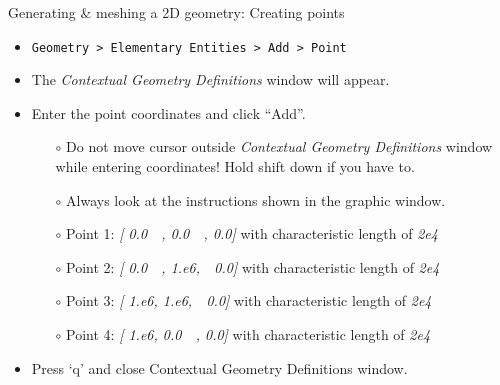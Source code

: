 \documentclass[t]{beamer}
\begin{document}
\begin{frame}{Generating \& meshing a 2D geometry: Creating points}
  \begin{itemize}
  \item \lstinline{Geometry > Elementary Entities > Add > Point}\\[4pt]
  \item The \emph{Contextual Geometry Definitions} window will appear.\\[4pt]
  \item Enter the point coordinates and click ``Add''.\\[4pt]
  \begin{itemize}
    \item[$\circ$] Do not move cursor outside \emph{Contextual Geometry Definitions} window while entering coordinates! Hold shift down if you have to.\\[4pt]
    \item[$\circ$] Always look at the instructions shown in the graphic window.\\[4pt]
    \item[$\circ$] Point 1: \emph{[ 0.0\ \ ,  0.0\ \ ,  0.0]} with characteristic length of \emph{2e4}\\[5pt]
    \item[$\circ$] Point 2: \emph{[ 0.0\ \ ,  1.e6,\ \ 0.0]} with characteristic length of \emph{2e4}\\[5pt]
    \item[$\circ$] Point 3: \emph{[ 1.e6, 1.e6,\ \ 0.0]} with characteristic length of \emph{2e4}\\[5pt]
    \item[$\circ$] Point 4: \emph{[ 1.e6, 0.0\ \ ,  0.0]} with characteristic length of \emph{2e4}\\[5pt]
    \end{itemize}
  \item Press `q' and close Contextual Geometry Definitions window.
  \end{itemize}
\end{frame}
\end{document}
